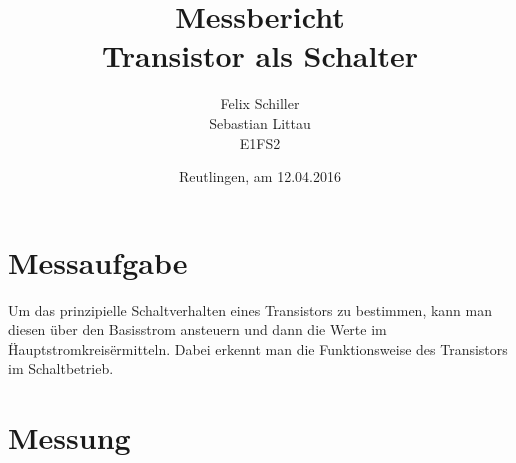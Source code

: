 \documentclass[
a4paper,     %
 headsepline, %
11pt         %
]{scrartcl}  %
\title{Messbericht \\ Transistor als Schalter}
\author{Felix Schiller \\ Sebastian Littau \\ E1FS2}
\date{Reutlingen, am 12.04.2016}
\begin{document}

\maketitle

\newpage
\tableofcontents





\section{Messaufgabe}
Um das prinzipielle Schaltverhalten eines Transistors zu bestimmen, kann man diesen über den Basisstrom ansteuern und dann die Werte im \"Hauptstromkreis\" ermitteln. Dabei erkennt man die Funktionsweise des Transistors im Schaltbetrieb.

\section{Messung}
\end{document}
